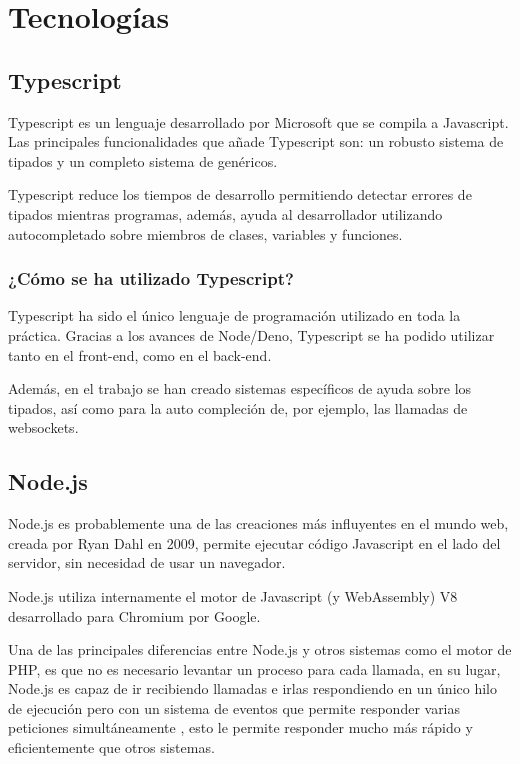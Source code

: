 \section{Tecnologías}


\subsection{Typescript}
Typescript \cite{typescript_docs} es un lenguaje desarrollado por Microsoft que se compila a Javascript. Las principales funcionalidades que añade Typescript son: un robusto sistema de tipados y un completo sistema de genéricos.

Typescript reduce los tiempos de desarrollo permitiendo detectar errores de tipados mientras programas, además, ayuda al desarrollador utilizando autocompletado sobre miembros de clases, variables y funciones.

\subsubsection{¿Cómo se ha utilizado Typescript?}
Typescript ha sido el único lenguaje de programación utilizado en toda la práctica. Gracias a los avances de Node/Deno, Typescript se ha podido utilizar tanto en el front-end, como en el back-end.

Además, en el trabajo se han creado sistemas específicos de ayuda sobre los tipados, así como para la auto compleción de, por ejemplo, las llamadas de websockets.


\subsection{Node.js}
Node.js \cite{nodejs_docs} es probablemente una de las creaciones más influyentes en el mundo web, creada por Ryan Dahl en 2009, permite ejecutar código Javascript en el lado del servidor, sin necesidad de usar un navegador.

Node.js utiliza internamente el motor de Javascript (y WebAssembly) V8 desarrollado para Chromium por Google.

Una de las principales diferencias entre Node.js y otros sistemas como el motor de PHP, es que no es necesario levantar un proceso para cada llamada, en su lugar, Node.js es capaz de ir recibiendo llamadas e irlas respondiendo en un único hilo de ejecución pero con un sistema de eventos que permite responder varias peticiones simultáneamente , esto le permite responder mucho más rápido y eficientemente que otros sistemas.

